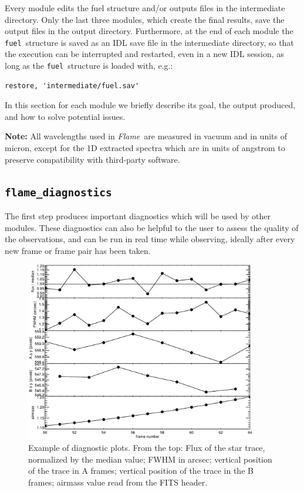 \documentclass[a4paper]{article}
\newcommand{\flame}{\emph{Flame}}
\newcommand{\fuel}{\texttt{fuel}}
\begin{document}
\begin{sloppypar}
Every module edits the fuel structure and/or outputs files in the intermediate directory. Only the last three modules, which create the final results, save the output files in the output directory. Furthermore, at the end of each module the \fuel\ structure is saved as an IDL save file in the intermediate directory, so that the execution can be interrupted and restarted, even in a new IDL session, as long as the \fuel\ structure is loaded with, e.g.:
\begin{lstlisting}
restore, 'intermediate/fuel.sav'
\end{lstlisting}


In this section for each module we briefly describe its goal, the output produced, and how to solve potential issues.

\medskip
\noindent
\textbf{Note:} All wavelengths used in \flame\ are measured in vacuum and in units of micron, except for the 1D extracted spectra which are in units of angstrom to preserve compatibility with third-party software.




\subsection{\texttt{flame\_diagnostics}}
\label{sec:diagnostics}

The first step produces important diagnostics which will be used by other modules. These diagnostics can also be helpful to the user to assess the quality of the observations, and can be run in real time while observing, ideally after every new frame or frame pair has been taken.

\begin{figure}[htbp]
\centering
\includegraphics[width=0.9\textwidth]{diagnostics}
\caption{Example of diagnostic plots. From the top: Flux of the star trace, normalized by the median value; FWHM in arcsec; vertical position of the trace in A frames; vertical position of the trace in the B frames; airmass value read from the FITS header.}
\label{fig:diagnostics}
\end{figure}


\end{sloppypar}
\end{document}
